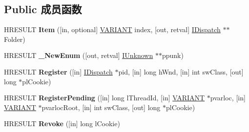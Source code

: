 \subsection*{Public 成员函数}
\begin{DoxyCompactItemize}
\item 
\mbox{\label{interface_s_h_doc_vw_1_1_i_shell_windows_ac38076bf3828d76ecf7250cebc9db712}} 
H\+R\+E\+S\+U\+LT {\bfseries Item} (\mbox{[}in, optional\mbox{]} \hyperlink{structtag_v_a_r_i_a_n_t}{V\+A\+R\+I\+A\+NT} index, \mbox{[}out, retval\mbox{]} \hyperlink{interface_i_dispatch}{I\+Dispatch} $\ast$$\ast$Folder)
\item 
\mbox{\label{interface_s_h_doc_vw_1_1_i_shell_windows_af0f9c20f710adbf39fafd0b7950d431f}} 
H\+R\+E\+S\+U\+LT {\bfseries \+\_\+\+New\+Enum} (\mbox{[}out, retval\mbox{]} \hyperlink{interface_i_unknown}{I\+Unknown} $\ast$$\ast$ppunk)
\item 
\mbox{\label{interface_s_h_doc_vw_1_1_i_shell_windows_a4cce9e38b560b4f9b49398aa205750d8}} 
H\+R\+E\+S\+U\+LT {\bfseries Register} (\mbox{[}in\mbox{]} \hyperlink{interface_i_dispatch}{I\+Dispatch} $\ast$pid, \mbox{[}in\mbox{]} long h\+Wnd, \mbox{[}in\mbox{]} int sw\+Class, \mbox{[}out\mbox{]} long $\ast$pl\+Cookie)
\item 
\mbox{\label{interface_s_h_doc_vw_1_1_i_shell_windows_ac030e1d2e3dd1354a2d44fe426284d4a}} 
H\+R\+E\+S\+U\+LT {\bfseries Register\+Pending} (\mbox{[}in\mbox{]} long l\+Thread\+Id, \mbox{[}in\mbox{]} \hyperlink{structtag_v_a_r_i_a_n_t}{V\+A\+R\+I\+A\+NT} $\ast$pvarloc, \mbox{[}in\mbox{]} \hyperlink{structtag_v_a_r_i_a_n_t}{V\+A\+R\+I\+A\+NT} $\ast$pvarloc\+Root, \mbox{[}in\mbox{]} int sw\+Class, \mbox{[}out\mbox{]} long $\ast$pl\+Cookie)
\item 
\mbox{\label{interface_s_h_doc_vw_1_1_i_shell_windows_a914d68c9bf3e9df4fa1cf64b9b38a8ce}} 
H\+R\+E\+S\+U\+LT {\bfseries Revoke} (\mbox{[}in\mbox{]} long l\+Cookie)
\item 
\mbox{\label{interface_s_h_doc_vw_1_1_i_shell_windows_a3295bfdaaaea29b0d0c69d851fd693d5}} 

\end{DoxyCompactItemize}
